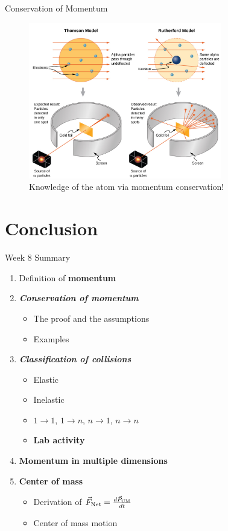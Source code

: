 \documentclass{beamer}
\begin{document}
\begin{frame}{Conservation of Momentum}
\begin{figure}
\centering
\includegraphics[width=0.75\textwidth]{figures/alpha.png}
\caption{\label{fig:alpha} Knowledge of the atom via momentum conservation!}
\end{figure}
\end{frame}

\section{Conclusion}

\begin{frame}{Week 8 Summary}
\begin{enumerate}
\item Definition of \alert{\textbf{momentum}}
\item \alert{\textbf{\textit{Conservation of momentum}}}
\begin{itemize}
\item The proof and the assumptions
\item Examples
\end{itemize}
\item \alert{\textbf{\textit{Classification of collisions}}}
\begin{itemize}
\item Elastic
\item Inelastic
\item $1 \rightarrow 1$, $1 \rightarrow n$, $n \rightarrow 1$, $n \rightarrow n$
\item \textbf{Lab activity}
\end{itemize}
\item \textbf{Momentum in multiple dimensions}
\item \textbf{Center of mass}
\begin{itemize}
\item Derivation of $\vec{F}_{\rm Net} = \frac{d\vec{P}_{\rm CM}}{dt}$
\item Center of mass motion
\end{itemize}
\end{enumerate}
\end{frame}
\end{document}
